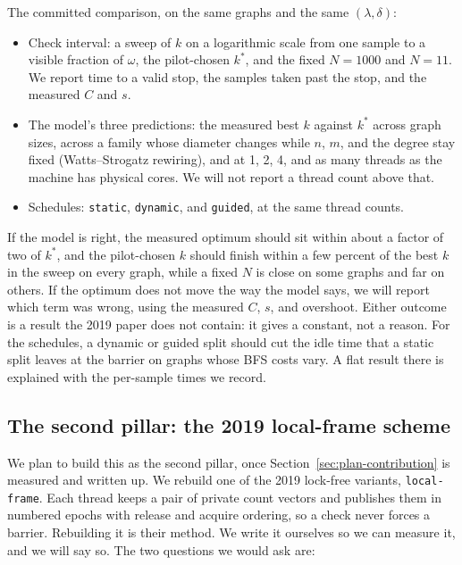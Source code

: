 \documentclass[11pt]{article}
\begin{document}
The committed comparison, on the same graphs and the same $(\lambda,\delta)$:

\begin{itemize}
\item Check interval: a sweep of $k$ on a logarithmic scale from one sample to a visible fraction of $\omega$, the pilot-chosen $k^\ast$, and the fixed $N=1000$ and $N=11$. We report time to a valid stop, the samples taken past the stop, and the measured $C$ and $s$.
\item The model's three predictions: the measured best $k$ against $k^\ast$ across graph sizes, across a family whose diameter changes while $n$, $m$, and the degree stay fixed (Watts--Strogatz rewiring), and at 1, 2, 4, and as many threads as the machine has physical cores. We will not report a thread count above that.
\item Schedules: \texttt{static}, \texttt{dynamic}, and \texttt{guided}, at the same thread counts.
\end{itemize}

If the model is right, the measured optimum should sit within about a factor of two of $k^\ast$, and the pilot-chosen $k$ should finish within a few percent of the best $k$ in the sweep on every graph, while a fixed $N$ is close on some graphs and far on others. If the optimum does not move the way the model says, we will report which term was wrong, using the measured $C$, $s$, and overshoot. Either outcome is a result the 2019 paper does not contain: it gives a constant, not a reason. For the schedules, a dynamic or guided split should cut the idle time that a static split leaves at the barrier on graphs whose BFS costs vary. A flat result there is explained with the per-sample times we record.

\subsection{The second pillar: the 2019 local-frame scheme}
\label{sec:plan-stretch}

We plan to build this as the second pillar, once Section~\ref{sec:plan-contribution} is measured and written up. We rebuild one of the 2019 lock-free variants, \texttt{local-frame}. Each thread keeps a pair of private count vectors and publishes them in numbered epochs with release and acquire ordering, so a check never forces a barrier. Rebuilding it is their method. We write it ourselves so we can measure it, and we will say so. The two questions we would ask are:
\end{document}
